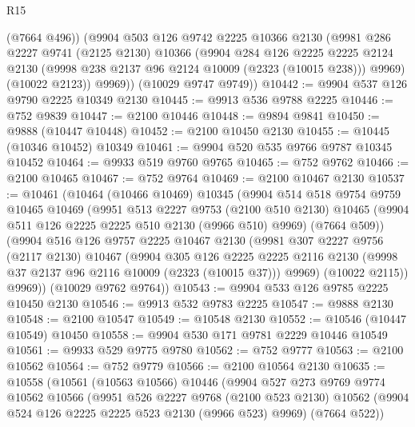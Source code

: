 \begin{lexlean}{R15}
\begin{coremodule}
          (@7664 @496))
        (@9904
          @503
          @126
          @9742
          @2225
          @10366
          @2130
          (@9981
            @286
            @2227
            @9741
            (@2125 @2130)
            @10366
            (@9904
              @284
              @126
              @2225
              @2225
              @2124
              @2130
              (@9998 @238 @2137 @96 @2124 @10009 (@2323 (@10015 @238)))
              @9969)
            (@10022 @2123))
          @9969))
      (@10029 @9747 @9749))
@10442 := @9904 @537 @126 @9790 @2225 @10349 @2130
@10445 := @9913 @536 @9788 @2225
@10446 := @752 @9839
@10447 := @2100 @10446
@10448 := @9894 @9841
@10450 := @9888 (@10447 @10448)
@10452 := @2100 @10450 @2130
@10455 := @10445 (@10346 @10452) @10349
@10461 := @9904 @520 @535 @9766 @9787 @10345 @10452
@10464 := @9933 @519 @9760 @9765
@10465 := @752 @9762
@10466 := @2100 @10465
@10467 := @752 @9764
@10469 := @2100 @10467 @2130
@10537 := @10461
    (@10464
      (@10466 @10469)
      @10345
      (@9904
        @514
        @518
        @9754
        @9759
        @10465
        @10469
        (@9951
          @513
          @2227
          @9753
          (@2100 @510 @2130)
          @10465
          (@9904 @511 @126 @2225 @2225 @510 @2130 (@9966 @510) @9969)
          (@7664 @509))
        (@9904
          @516
          @126
          @9757
          @2225
          @10467
          @2130
          (@9981
            @307
            @2227
            @9756
            (@2117 @2130)
            @10467
            (@9904
              @305
              @126
              @2225
              @2225
              @2116
              @2130
              (@9998 @37 @2137 @96 @2116 @10009 (@2323 (@10015 @37)))
              @9969)
            (@10022 @2115))
          @9969))
      (@10029 @9762 @9764))
@10543 := @9904 @533 @126 @9785 @2225 @10450 @2130
@10546 := @9913 @532 @9783 @2225
@10547 := @9888 @2130
@10548 := @2100 @10547
@10549 := @10548 @2130
@10552 := @10546 (@10447 @10549) @10450
@10558 := @9904 @530 @171 @9781 @2229 @10446 @10549
@10561 := @9933 @529 @9775 @9780
@10562 := @752 @9777
@10563 := @2100 @10562
@10564 := @752 @9779
@10566 := @2100 @10564 @2130
@10635 := @10558
    (@10561
      (@10563 @10566)
      @10446
      (@9904
        @527
        @273
        @9769
        @9774
        @10562
        @10566
        (@9951
          @526
          @2227
          @9768
          (@2100 @523 @2130)
          @10562
          (@9904 @524 @126 @2225 @2225 @523 @2130 (@9966 @523) @9969)
          (@7664 @522))

\end{coremodule}
\end{lexlean}
